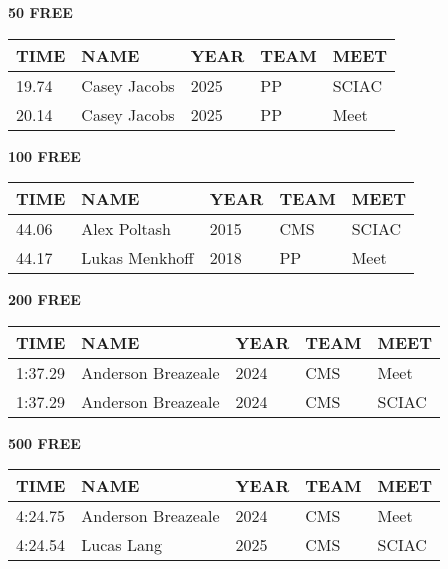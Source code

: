 \begin{minipage}[t]{0.48\textwidth}
\centering
\textbf{50 FREE}\\[0.05cm]
\begin{tabular}{@{}p{1.8cm}p{2.8cm}p{1.2cm}p{1.4cm}p{1.4cm}@{}}
\hline
\textbf{TIME} & \textbf{NAME} & \textbf{YEAR} & \textbf{TEAM} & \textbf{MEET} \\
\hline
19.74 & Casey Jacobs & 2025 & PP & SCIAC \\
20.14 & Casey Jacobs & 2025 & PP & Meet \\
\hline
\end{tabular}
\end{minipage}\hfill
\begin{minipage}[t]{0.48\textwidth}
\centering
\textbf{100 FREE}\\[0.05cm]
\begin{tabular}{@{}p{1.8cm}p{2.8cm}p{1.2cm}p{1.4cm}p{1.4cm}@{}}
\hline
\textbf{TIME} & \textbf{NAME} & \textbf{YEAR} & \textbf{TEAM} & \textbf{MEET} \\
\hline
44.06 & Alex Poltash & 2015 & CMS & SCIAC \\
44.17 & Lukas Menkhoff & 2018 & PP & Meet \\
\hline
\end{tabular}
\end{minipage}

\vspace{0.4cm}

\begin{minipage}[t]{0.48\textwidth}
\centering
\textbf{200 FREE}\\[0.05cm]
\begin{tabular}{@{}p{1.8cm}p{2.8cm}p{1.2cm}p{1.4cm}p{1.4cm}@{}}
\hline
\textbf{TIME} & \textbf{NAME} & \textbf{YEAR} & \textbf{TEAM} & \textbf{MEET} \\
\hline
1:37.29 & Anderson Breazeale & 2024 & CMS & Meet \\
1:37.29 & Anderson Breazeale & 2024 & CMS & SCIAC \\
\hline
\end{tabular}
\end{minipage}\hfill
\begin{minipage}[t]{0.48\textwidth}
\centering
\textbf{500 FREE}\\[0.05cm]
\begin{tabular}{@{}p{1.8cm}p{2.8cm}p{1.2cm}p{1.4cm}p{1.4cm}@{}}
\hline
\textbf{TIME} & \textbf{NAME} & \textbf{YEAR} & \textbf{TEAM} & \textbf{MEET} \\
\hline
4:24.75 & Anderson Breazeale & 2024 & CMS & Meet \\
4:24.54 & Lucas Lang & 2025 & CMS & SCIAC \\
\hline
\end{tabular}
\end{minipage}

